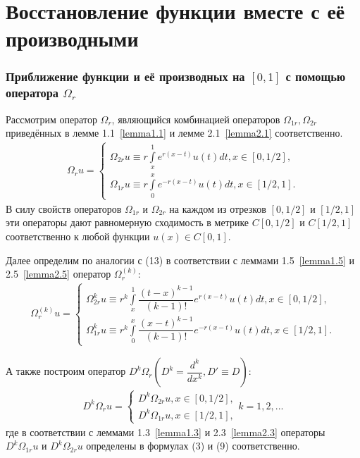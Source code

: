 \documentclass[10pt,utf8,presentation,notheorems]{beamer}
\theoremstyle{plain}
\theoremstyle{definition}
\begin{document}
\section{Восстановление функции вместе с её производными}
\begin{frame}
\frametitle{Приближение функции и её производных на $ [0,1] $ с помощью оператора $ \Omega_r $}
Рассмотрим оператор $ \Omega_r $, являющийся комбинацией операторов $ \Omega_{1r}, \Omega_{2r} $ приведённых в лемме 1.1~\eqref{lemma1.1} и лемме 2.1~\eqref{lemma2.1} соответственно.
\begin{equation}
\begin{array}{c}
\Omega_r u = \left\{
\begin{array}{l}
\Omega_{2r}u \equiv r\int\limits_x^1 e^{r(x-t)}u(t)dt, x \in [0,1/2], \\
\Omega_{1r}u \equiv r\int\limits_0^x e^{-r(x-t)}u(t)dt, x \in [1/2,1].
\end{array}
\right.
\end{array}
\end{equation}
В силу свойств операторов $ \Omega_{1r} $ и $ \Omega_{2r} $ на каждом из отрезков $ [0,1/2] $ и $ [1/2,1] $ эти операторы дают равномерную сходимость в метрике $ C[0,1/2] $ и $ C[1/2,1] $ соответственно к любой функции $ u(x) \in C[0,1] $.
\end{frame}

\begin{frame}
Далее определим по аналогии с (13) в соответствии с леммами 1.5~\eqref{lemma1.5} и 2.5~\eqref{lemma2.5} оператор $ \Omega_r^{(k)} $:
\begin{equation}
\begin{array}{c}
\Omega_r^{(k)} u = \left\{
\begin{array}{l}
\Omega_{2r}^ku \equiv r^k\int\limits_x^1 \dfrac{(t-x)^{k-1}}{(k-1)!} e^{r(x-t)}u(t)dt, x \in [0,1/2], \\
\Omega_{1r}^ku \equiv r^k\int\limits_0^x \dfrac{(x-t)^{k-1}}{(k-1)!} e^{-r(x-t)}u(t)dt, x \in [1/2,1].
\end{array}
\right.
\end{array}
\end{equation}

А также построим оператор $ D^k\Omega_r (D^k=\dfrac{d^k}{dx^k}, D' \equiv D) $:
\begin{equation}
\begin{array}{c}
D^k\Omega_r u = \left\{
\begin{array}{l}
D^k\Omega_{2r}u, x \in [0,1/2], \\
D^k\Omega_{1r}u, x \in [1/2,1],
\end{array}
\right.
k=1,2,...
\end{array}
\end{equation}
где в соответствии с леммами 1.3~\eqref{lemma1.3} и 2.3~\eqref{lemma2.3} операторы $ D^k\Omega_{1r}u $ и $ D^k\Omega_{2r}u $ определены в формулах (3) и (9) соответственно.
\end{frame}
\end{document}
